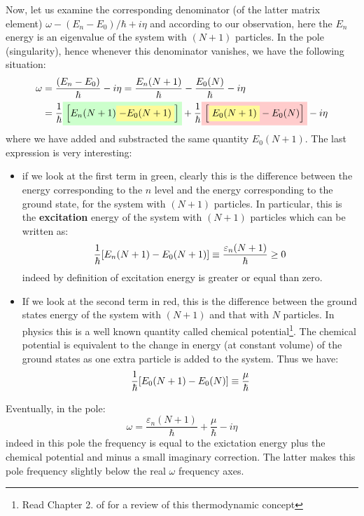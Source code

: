 \documentclass[../main/main.tex]{subfiles}
\begin{document}
Now, let us examine the corresponding denominator (of the latter matrix element) \( \omega - (E_n - E_0)/\hbar  + i \eta  \) and according to our observation, here the \( E_n \) energy is an eigenvalue of the system with \( (N+1) \) particles.
In the pole (singularity), hence whenever this denominator vanishes, we have the following situation:
\begin{equation}
\begin{split}
\omega   &= \frac{(E_n-E_0)}{\hbar }  - i \eta = \frac{E_n(N+1)}{\hbar } - \frac{E_0 (N)}{\hbar } - i \eta \\
&= \frac{1}{\hbar } \mathcolorbox{green!20}{\qty[ E_n (N+1) \mathcolorbox{yellow!40}{-E_0 (N+1)} ]} + \frac{1}{\hbar } \mathcolorbox{red!20}{\qty[ \mathcolorbox{yellow!40}{E_0 (N+1)} - E_0 (N)]} - i \eta
\end{split}
\label{eq:9_4}
\end{equation}
where we have added and substracted the same quantity \( E_0(N+1) \). The last expression is very interesting:
\begin{itemize}
\item if we look at the first term in green, clearly this is the difference between the energy corresponding to the \( n \) level and the energy corresponding to the ground state, for the system with \( (N+1) \) particles. In particular, this is the \textbf{excitation} energy of the system with \( (N+1) \) particles which can be written as:
\begin{equation*}
  \frac{1}{\hbar }\qty[ E_n (N+1) -E_0 (N+1) ] \equiv  \frac{\varepsilon _n (N+1)}{\hbar } \ge 0
\end{equation*}
indeed by definition of excitation energy is greater or equal than zero.

\item If we look at the second term in red, this is the difference between the ground states energy of the system with \( (N+1) \) and that with \( N \) particles. In physics this is a well known quantity called chemical potential\footnote{Read Chapter 2. of \cite{Fetter} for a review of this thermodynamic concept}.
The chemical potential is equivalent to the change in energy (at constant volume) of the ground states as one extra particle is added to the system. Thus we have:
\begin{equation*}
  \frac{1}{\hbar } \qty[ E_0 (N+1)- E_0 (N)] \equiv  \frac{\mu }{\hbar }
\end{equation*}

\end{itemize}
Eventually, in the pole:
\begin{equation}
  \omega = \frac{\varepsilon _n (N+1)}{\hbar } + \frac{\mu }{\hbar } - i \eta
  \label{eq:9_6}
\end{equation}
indeed in this pole the frequency is equal to the exictation energy plus the chemical potential and minus a small imaginary correction. The latter makes this pole frequency slightly below the real \( \omega  \) frequency axes.
\end{document}
